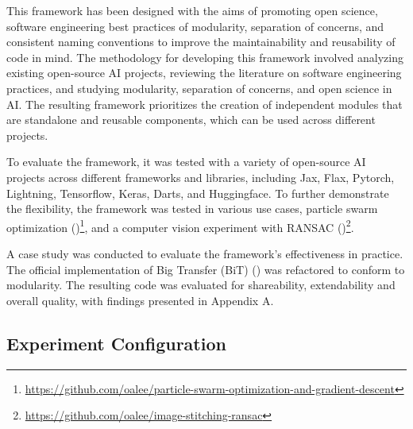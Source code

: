 This framework has been designed with the aims of promoting open science, software engineering best practices of modularity, separation of concerns, and consistent naming conventions to improve the maintainability and reusability of code in mind. The methodology for developing this framework involved analyzing existing open-source AI projects, reviewing the literature on software engineering practices, and studying modularity, separation of concerns, and open science in AI. The resulting framework prioritizes the creation of independent modules that are standalone and reusable components, which can be used across different projects.



To evaluate the framework, it was tested with a variety of open-source AI projects across different frameworks and libraries, including Jax, Flax, Pytorch, Lightning, Tensorflow, Keras, Darts, and Huggingface. To further demonstrate the flexibility, the framework was tested in various use cases, particle swarm optimization (\cite{kennedy1995particle})\footnote{\url{https://github.com/oalee/particle-swarm-optimization-and-gradient-descent}}, and a computer vision experiment with RANSAC (\cite{lowe2004distinctive})\footnote{\url{https://github.com/oalee/image-stitching-ransac}}.

A case study was conducted to evaluate the framework's effectiveness in practice. The official implementation of Big Transfer (BiT)  (\cite{transferlearning}) was refactored to conform to modularity. The resulting code was evaluated for shareability, extendability and overall quality, with findings presented in Appendix A.


\subsection{Experiment Configuration}

